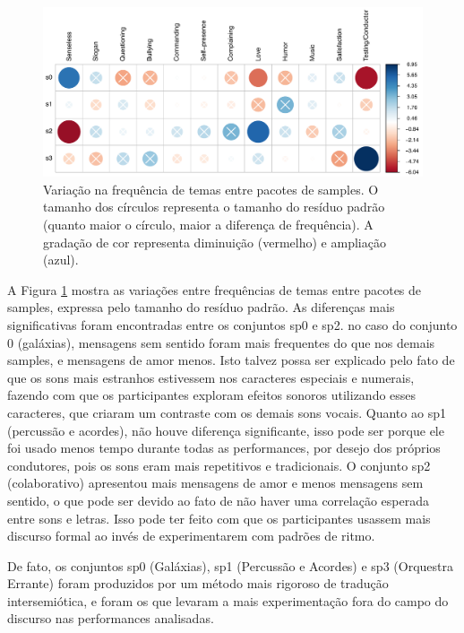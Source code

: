 \begin{figure}

\includegraphics[width=1\linewidth]{pictures/cap3/p_values}
\caption{Variação na frequência de temas entre pacotes de samples. O tamanho dos círculos representa o tamanho do resíduo padrão (quanto maior o círculo, maior a diferença de frequência). A gradação de cor representa diminuição (vermelho) e ampliação (azul).}
\label{fig:bblplot2}
\end{figure}

A Figura \ref{fig:bblplot2} mostra as variações entre frequências de temas entre pacotes de samples, expressa pelo tamanho do resíduo padrão. As diferenças mais significativas foram encontradas entre os conjuntos sp0 e sp2. no caso do conjunto 0 (galáxias), mensagens sem sentido foram mais frequentes do que nos demais samples, e mensagens de amor menos. Isto talvez possa ser explicado pelo fato de que os sons mais estranhos estivessem nos caracteres especiais e numerais, fazendo com que os participantes exploram efeitos sonoros utilizando esses caracteres, que criaram um contraste com os demais sons vocais. Quanto ao sp1 (percussão e acordes), não houve diferença significante, isso pode ser porque ele foi usado menos tempo durante todas as performances, por desejo dos próprios condutores, pois os sons eram mais repetitivos e tradicionais. O conjunto sp2 (colaborativo) apresentou mais mensagens de amor e menos mensagens sem sentido, o que pode ser devido ao fato de não haver uma correlação esperada entre sons e letras. Isso pode ter feito com que os participantes usassem mais discurso formal ao invés de experimentarem com padrões de ritmo. 

De fato, os conjuntos sp0 (Galáxias), sp1 (Percussão e Acordes) e sp3 (Orquestra Errante) foram produzidos por um método mais rigoroso de tradução intersemiótica, e foram os que levaram a mais experimentação fora do campo do discurso nas performances analisadas. 

